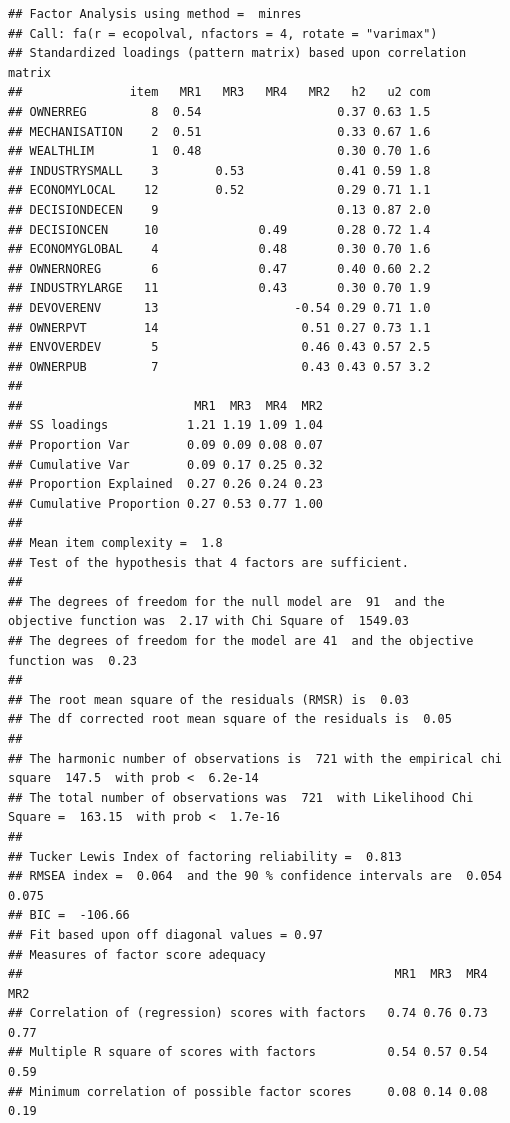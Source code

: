 \documentclass[
]{article}
\begin{document}
\begin{verbatim}
## Factor Analysis using method =  minres
## Call: fa(r = ecopolval, nfactors = 4, rotate = "varimax")
## Standardized loadings (pattern matrix) based upon correlation matrix
##               item   MR1   MR3   MR4   MR2   h2   u2 com
## OWNERREG         8  0.54                   0.37 0.63 1.5
## MECHANISATION    2  0.51                   0.33 0.67 1.6
## WEALTHLIM        1  0.48                   0.30 0.70 1.6
## INDUSTRYSMALL    3        0.53             0.41 0.59 1.8
## ECONOMYLOCAL    12        0.52             0.29 0.71 1.1
## DECISIONDECEN    9                         0.13 0.87 2.0
## DECISIONCEN     10              0.49       0.28 0.72 1.4
## ECONOMYGLOBAL    4              0.48       0.30 0.70 1.6
## OWNERNOREG       6              0.47       0.40 0.60 2.2
## INDUSTRYLARGE   11              0.43       0.30 0.70 1.9
## DEVOVERENV      13                   -0.54 0.29 0.71 1.0
## OWNERPVT        14                    0.51 0.27 0.73 1.1
## ENVOVERDEV       5                    0.46 0.43 0.57 2.5
## OWNERPUB         7                    0.43 0.43 0.57 3.2
## 
##                        MR1  MR3  MR4  MR2
## SS loadings           1.21 1.19 1.09 1.04
## Proportion Var        0.09 0.09 0.08 0.07
## Cumulative Var        0.09 0.17 0.25 0.32
## Proportion Explained  0.27 0.26 0.24 0.23
## Cumulative Proportion 0.27 0.53 0.77 1.00
## 
## Mean item complexity =  1.8
## Test of the hypothesis that 4 factors are sufficient.
## 
## The degrees of freedom for the null model are  91  and the objective function was  2.17 with Chi Square of  1549.03
## The degrees of freedom for the model are 41  and the objective function was  0.23 
## 
## The root mean square of the residuals (RMSR) is  0.03 
## The df corrected root mean square of the residuals is  0.05 
## 
## The harmonic number of observations is  721 with the empirical chi square  147.5  with prob <  6.2e-14 
## The total number of observations was  721  with Likelihood Chi Square =  163.15  with prob <  1.7e-16 
## 
## Tucker Lewis Index of factoring reliability =  0.813
## RMSEA index =  0.064  and the 90 % confidence intervals are  0.054 0.075
## BIC =  -106.66
## Fit based upon off diagonal values = 0.97
## Measures of factor score adequacy             
##                                                    MR1  MR3  MR4  MR2
## Correlation of (regression) scores with factors   0.74 0.76 0.73 0.77
## Multiple R square of scores with factors          0.54 0.57 0.54 0.59
## Minimum correlation of possible factor scores     0.08 0.14 0.08 0.19
\end{verbatim}
\end{document}
